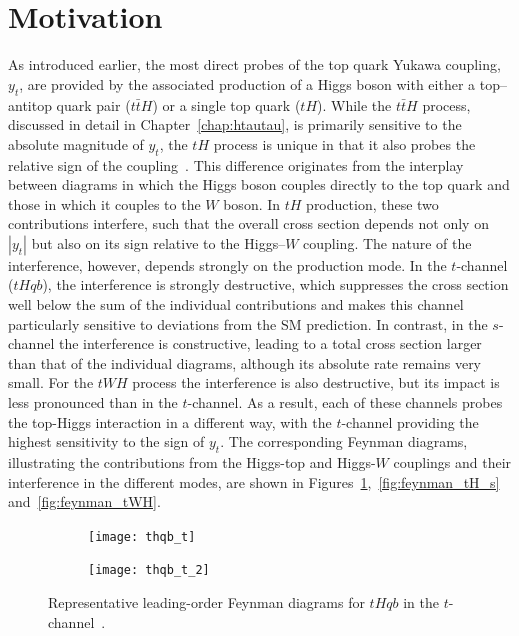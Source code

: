 \section{Motivation}
As introduced earlier, the most direct probes of the top quark Yukawa coupling, $y_{t}$, are provided by the associated production of a Higgs boson with either a top--antitop quark pair ($t\bar{t}H$) or a single top quark ($tH$). 
While the $t\bar{t}H$ process, discussed in detail in Chapter~\ref{chap:htautau}, is primarily sensitive to the absolute magnitude of $y_{t}$, the $tH$ process is unique in that it also probes the relative sign of the coupling~\cite{Tait_2000,Barger_2010,Biswas_2013,Farina_2013,Chang_2014}. 
This difference originates from the interplay between diagrams in which the Higgs boson couples directly to the top quark and those in which it couples to the $W$ boson. 
In $tH$ production, these two contributions interfere, such that the overall cross section depends not only on $|y_{t}|$ but also on its sign relative to the Higgs--$W$ coupling. 
The nature of the interference, however, depends strongly on the production mode. 
In the $t$-channel ($tHqb$), the interference is strongly destructive, which suppresses the cross section well below the sum of the individual contributions and makes this channel particularly sensitive to deviations from the SM prediction. 
In contrast, in the $s$-channel the interference is constructive, leading to a total cross section larger than that of the individual diagrams, although its absolute rate remains very small.
For the $tWH$ process the interference is also destructive, but its impact is less pronounced than in the $t$-channel. 
As a result, each of these channels probes the top-Higgs interaction in a different way, with the $t$-channel providing the highest sensitivity to the sign of $y_t$. 
The corresponding Feynman diagrams, illustrating the contributions from the Higgs-top and Higgs-$W$ couplings and their interference in the different modes, are shown in Figures~\ref{fig:feynman_tH_t},~\ref{fig:feynman_tH_s} and~\ref{fig:feynman_tWH}.

\begin{figure}[htbp]
    \centering
    \begin{subfigure}[b]{0.4\textwidth}
      \centering
      \texttt{[image: thqb\_t]}
    \end{subfigure}
    \begin{subfigure}[b]{0.4\textwidth}
      \centering
      \texttt{[image: thqb\_t\_2]}
    \end{subfigure}
    \caption{Representative leading-order Feynman diagrams for $tHqb$ in the $t$-channel~\cite{Barger_2010}.}
    \label{fig:feynman_tH_t}
  \end{figure}


